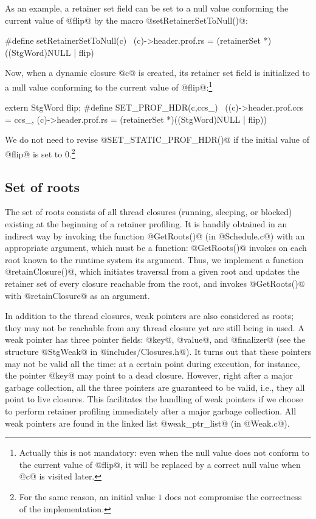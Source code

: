 \documentclass{article}
\begin{document}
As an example, a retainer set field can be set to a null value conforming
the current value of @flip@ by the macro @setRetainerSetToNull()@:

\begin{code}
#define setRetainerSetToNull(c)   \
  (c)->header.prof.rs = (retainerSet *)((StgWord)NULL | flip)
\end{code}

Now, when a dynamic closure @c@ is created, its retainer set field is
initialized to a null value conforming to the current value of 
@flip@:\footnote{Actually this is not mandatory: even when the null
value does not conform to the current value of @flip@, it will be replaced
by a correct null value when @c@ is visited later.}

\begin{code}
extern StgWord flip;
#define SET_PROF_HDR(c,ccs_)            \
        ((c)->header.prof.ccs = ccs_, (c)->header.prof.rs = (retainerSet *)((StgWord)NULL | flip))
\end{code}

We do not need to revise @SET_STATIC_PROF_HDR()@ if the initial value of
@flip@ is set to $0$.\footnote{For the same reason, an initial value $1$
does not compromise the correctness of the implementation.}

\subsection{Set of roots}

The set of roots consists of all thread closures (running, sleeping, or 
blocked) existing at the beginning of a retainer profiling. 
It is handily obtained in an indirect way by invoking the function
@GetRoots()@ (in @Schedule.c@) with an appropriate argument, which must be
a function:
@GetRoots()@ invokes on each root known to the runtime system its argument.
Thus, we implement a function @retainClosure()@, which initiates traversal
from a given root and updates the retainer set of every closure reachable
from the root,
and invokes @GetRoots()@ with @retainClosure@ as an argument.

In addition to the thread closures, weak pointers are also considered
as roots; they may not be reachable from any thread closure yet are still
being in used.
A weak pointer has three pointer fields: @key@, @value@, and 
@finalizer@ (see the structure @StgWeak@ in @includes/Closures.h@).
It turns out that these pointers may not be valid all the time:
at a certain point during execution, for instance, the pointer @key@ may point 
to a dead closure. 
However, right after a major garbage collection, all the three pointers are
guaranteed to be valid, i.e., they all point to live closures. 
This facilitates the handling of weak pointers if we choose to
perform retainer profiling immediately after a major garbage collection.
All weak pointers are found in the linked list @weak_ptr_list@ 
(in @Weak.c@).
\end{document}
